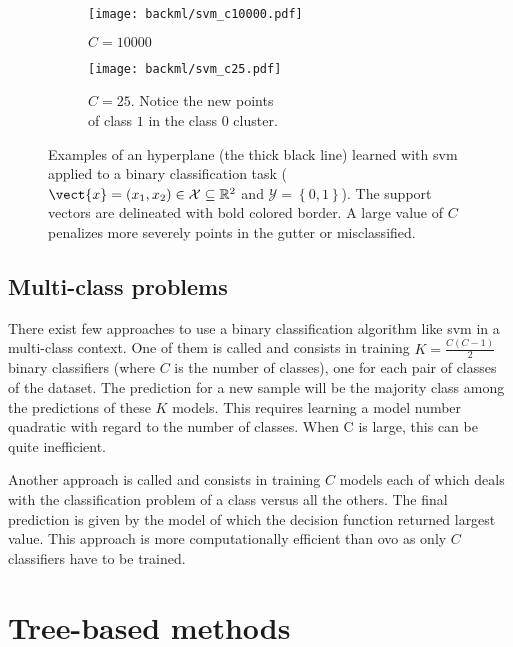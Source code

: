 \begin{figure}
  \centering
  \begin{subfigure}[t]{0.48\textwidth}
    \centering
    \texttt{[image: backml/svm\_c10000.pdf]}
    \caption{$C=10000$}
  \end{subfigure}
  \begin{subfigure}[t]{0.48\textwidth}
    \centering
    \texttt{[image: backml/svm\_c25.pdf]}
    \caption{$C=25$. Notice the new points \\ of class $1$ in the class $0$ cluster.}
  \end{subfigure}
  \caption{Examples of an hyperplane (the thick black line) learned with \acrshort{svm} applied to a binary classification task ($\vect{x} = (x_1, x_2) \in \mathcal{X} \subseteq \mathbb{R}^2$ and $\mathcal{Y} = \left\{0, 1\right\}$). The support vectors are delineated with bold colored border. A large value of $C$ penalizes more severely points in the gutter or misclassified.}
  \label{fig:backml:svm}
\end{figure}


\subsection{Multi-class problems}

There exist few approaches to use a binary classification algorithm like
\acrshort{svm} in a multi-class context. One of them is called 
and consists in training $K=\frac{C(C-1)}{2}$ binary classifiers (where $C$ is
the number of classes), one for each pair of classes of the dataset. The prediction
for a new sample will be the majority class among the predictions of these $K$
models. This requires learning a model number quadratic with regard to the number
of classes. When C is large, this can be quite inefficient.

Another approach is called  and consists in training $C$ models
each of which deals with the classification problem of a class versus all the
others. The final prediction is given by the model of which the decision function
returned largest value. This approach is more computationally efficient than
\acrshort{ovo} as only $C$ classifiers have to be trained.

\section{Tree-based methods}
\label{sec:backml:treebased}

